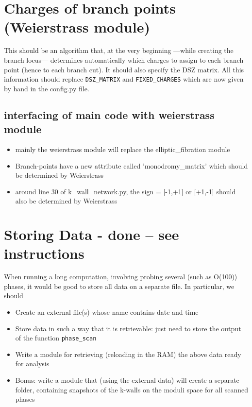 \documentclass[11pt]{report}
\begin{document}
\section{Charges of branch points (Weierstrass module)}
This should be an algorithm that, at the very beginning ---while creating the branch locus--- determines automatically which charges to assign to each branch point (hence to each branch cut).
It should also specify the DSZ matrix. All this information should replace {\tt DSZ\_MATRIX} and {\tt FIXED\_CHARGES} which are now given by hand in the config.py file.


\subsection{interfacing of main code with weierstrass module}
\begin{itemize}
\item mainly the weierstrass module will replace the elliptic\_fibration module
\item Branch-points have a new attribute called 'monodromy\_matrix' which should be determined by Weierstrass
\item around line 30 of k\_wall\_network.py, the sign = [-1,+1] or [+1,-1] should also be determined by Weierstrass
\end{itemize}


\section{Storing Data - {\color{red} \bf done -- see instructions}}
When running a long computation, involving probing several (such as O(100)) phases, it would be good to store all data on a separate file.
In particular, we should 
\begin{itemize}
	\item[\checkmark] Create an external file(s) whose name contains date and time
	\item[\checkmark] Store data in such a way that it is retrievable: just need to store the output of the function {\texttt{phase\_scan}}
	\item[\checkmark] Write a module for retrieving (reloading in the RAM) the above data ready for analysis
	\item[\checkmark] Bonus: write a module that (using the external data) will create a separate folder, containing snapshots of the k-walls on the moduli space for all scanned phases
\end{itemize}
\end{document}
